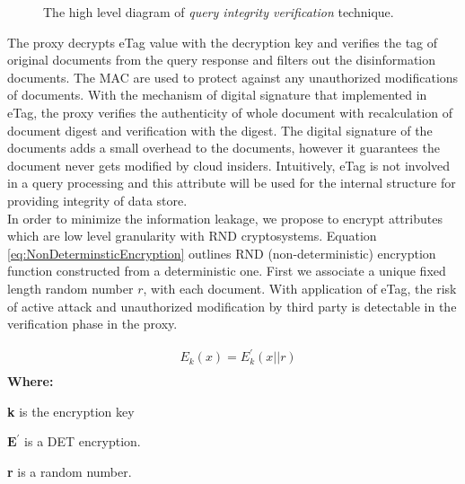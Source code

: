 \begin{figure}[H]
\centering
\resizebox{0.7\textwidth}{!}{}
\caption{The high level diagram of \textit{query integrity verification } technique.}
\label{fig:QueryIntegrityVerification}
\end{figure}

The proxy decrypts eTag value with the decryption key and verifies the tag of original documents from the query response and filters out the disinformation documents. The MAC are used to protect against any unauthorized modifications of documents. With the mechanism of digital signature that implemented in eTag, the proxy verifies the authenticity of whole document with recalculation of document digest and verification with the digest. The digital signature of the documents adds a small overhead to the documents, however it guarantees the document never gets modified by cloud insiders. Intuitively, eTag is not involved in a query processing and this attribute will be used for the internal structure for providing integrity of data store.\\

In order to minimize the information leakage, we propose to encrypt attributes which are low level granularity with RND cryptosystems. Equation \ref{eq:NonDeterminsticEncryption} outlines RND (non-deterministic) encryption function constructed from a deterministic one. First we associate a unique fixed length random number $r$, with each document. With application of eTag, the risk of active attack and unauthorized modification by third party is detectable in the verification phase in the proxy.


\begin{equation}
\label{eq:NonDeterminsticEncryption}
\begin{aligned}
& E_k (x) = E^{\prime}_k (x \left\lvert \right\rvert r) \\ 
\end{aligned}
\end{equation}
\textbf{Where:}\\
\begin{minipage}[b]{0.5\textwidth}
\raggedright
{\bf k} is the encryption key\par
{$\boldsymbol{E^{\prime}}$} is a DET encryption.
\end{minipage}%
\begin{minipage}[b]{0.5\textwidth}
\raggedright
{\bf r} is a random number.
\end{minipage}
\newline

